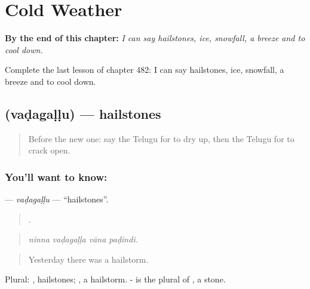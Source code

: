 
\chapter{Cold Weather}
\label{ch:te-cold-weather}

\begin{chapteropening}
\textbf{By the end of this chapter:} \emph{I can say hailstones, ice, snowfall, a breeze and to cool down.}

Complete the last lesson of chapter 482: I can say hailstones, ice, snowfall, a breeze and to cool down.
\end{chapteropening}

\section[\texorpdfstring{\te{వడగళ్ళు} (vaḍagaḷḷu)}{వడగళ్ళు (vaḍagaḷḷu)}]{ (vaḍagaḷḷu) — hailstones}

\label{lesson:TE-C482-vadagallu}



\begin{quote}
Before the new one: say the Telugu for to dry up, then the Telugu for to crack open.
\end{quote}

\subsection*{You'll want to know: }
\textbf{} — \emph{vaḍagaḷḷu} — \textquotedblleft{}hailstones\textquotedblright{}.

\begin{quote}
   .
\end{quote}

\begin{quote}
\emph{ninna vaḍagaḷḷa vāna paḍindi.}
\end{quote}

\begin{quote}
Yesterday there was a hailstorm.
\end{quote}

Plural: , hailstones;  , a hailstorm. - is the plural of , a stone.

